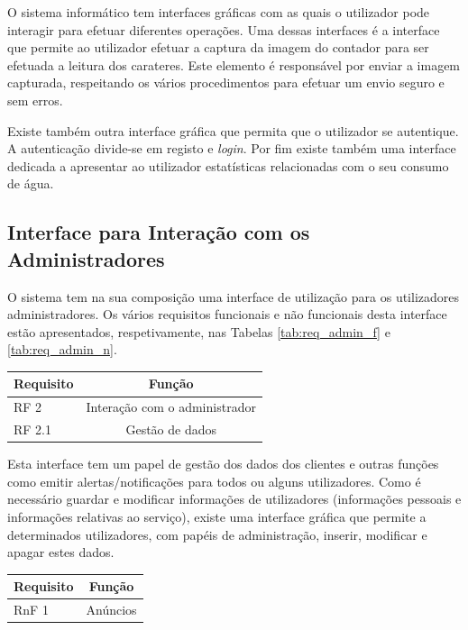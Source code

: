 O sistema informático tem interfaces gráficas com as quais o utilizador pode interagir para efetuar diferentes operações. Uma dessas interfaces é a interface que permite ao utilizador efetuar a captura da imagem do contador para ser efetuada a leitura dos carateres. Este elemento é responsável por enviar a imagem capturada, respeitando os vários procedimentos para efetuar um envio seguro e sem erros.\par
Existe também outra interface gráfica que permita que o utilizador se autentique. A autenticação divide-se em registo e {\textit{login}}. Por fim existe também uma interface dedicada a apresentar ao utilizador estatísticas relacionadas com o seu consumo de água.

\subsection{Interface para Interação com os Administradores} \label{sec:req_admin}
O sistema tem na sua composição uma interface de utilização para os utilizadores administradores. Os vários requisitos funcionais e não funcionais desta interface estão apresentados, respetivamente, nas Tabelas \ref{tab:req_admin_f} e \ref{tab:req_admin_n}.

\begin{center}
\begin{tabular}[c]{l c} 
\hline
Requisito & Função\\
\hline
RF 2 & Interação com o administrador\\ 

RF 2.1 & Gestão de dados\\

\hline
\end{tabular}
\label{tab:req_admin_f}
\end{center}
\vspace{8mm} %

Esta interface tem um papel de gestão dos dados dos clientes e outras funções como emitir alertas/notificações para todos ou alguns utilizadores. Como é necessário guardar e modificar informações de utilizadores (informações pessoais e informações relativas ao serviço), existe uma interface gráfica que permite a determinados utilizadores, com papéis de administração, inserir, modificar e apagar estes dados.

\begin{center}
\begin{tabular}[c]{l c} 
\hline
Requisito & Função\\
\hline
RnF 1 & Anúncios\\
\hline
\end{tabular}
\label{tab:req_admin_n}
\end{center}

